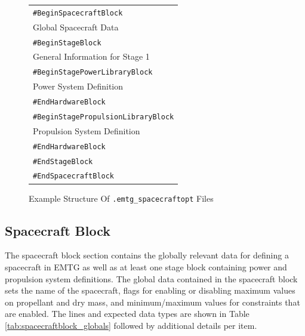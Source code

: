 \begin{figure}[H]
    \center
    \begin{tabular}{l}
    {\tt \#BeginSpacecraftBlock} \\
    \hspace{2em} {Global Spacecraft Data} \vspace{0.05in} \\
    \hspace{2em} {\tt \#BeginStageBlock} \\
    \hspace{4em} {General Information for Stage 1} \vspace{0.05in} \\
    \hspace{4em} {\tt \#BeginStagePowerLibraryBlock} \\
    \hspace{6em} {Power System Definition} \\
    \hspace{4em} {\tt \#EndHardwareBlock} \vspace{0.05in} \\
    \hspace{4em} {\tt \#BeginStagePropulsionLibraryBlock} \\
    \hspace{6em} {Propulsion System Definition} \\
    \hspace{4em} {\tt \#EndHardwareBlock} \vspace{0.05in} \\
    \hspace{2em} {\tt \#EndStageBlock} \vspace{0.05in} \\
    {\tt \#EndSpacecraftBlock}
    \end{tabular}
\caption{Example Structure Of {\tt .emtg\_spacecraftopt} Files}
\label{fig:config_spacecraftopt_organization}
\end{figure}

\subsection{Spacecraft Block}
The spacecraft block section contains the globally relevant data for defining a spacecraft in \ac{EMTG} as well as at least one stage block containing power and propulsion system definitions. The global data contained in the spacecraft block sets the name of the spacecraft, flags for enabling or disabling maximum values on propellant and dry mass, and minimum/maximum values for constraints that are enabled. The lines and expected data types are shown in Table \ref{tab:spacecraftblock_globals} followed by additional details per item.

